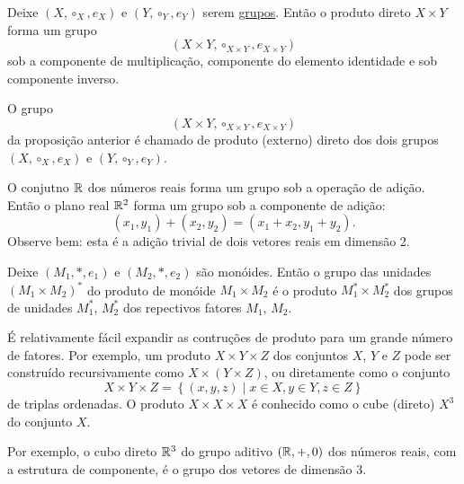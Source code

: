 \begin{stat}
  Deixe $(X, \circ_{X}, e_{X})$ e $(Y, \circ_{Y}, e_{Y})$ serem \underline{grupos}. Então o produto direto $X\times Y$ forma um grupo
  $$(X\times Y, \circ_{X\times Y}, e_{X\times Y})$$ sob a componente de multiplicação, componente do elemento identidade e sob componente inverso.
\end{stat}

\begin{definition}
  O grupo $$(X\times Y, \circ_{X\times Y}, e_{X\times Y})$$ da proposição anterior é chamado de produto (externo) direto dos dois grupos $(X, \circ_{X}, e_{X})$ e $(Y, \circ_{Y}, e_{Y})$.
\end{definition}

\begin{exmp}
  O conjutno $\mathbb{R}$ dos números reais forma um grupo sob a operação de adição. Então o plano real $\mathbb{R}^{2}$ forma um grupo sob a componente de adição:
  $$(x_{1},y_{1}) + (x_{2},y_{2}) = (x_{1}+x_{2}, y_{1}+y_{2}).$$
  Observe bem: esta é a adição trivial de dois vetores reais em dimensão 2.
\end{exmp}

\begin{theorem}
  Deixe $(M_{1},*,e_{1})$ e $(M_{2},*,e_{2})$ são monóides. Então o grupo das unidades $(M_{1} \times M_{2})^{*}$ do produto de monóide $M_{1} \times M_{2}$ é o produto $M_{1}^* \times M_{2}^*$ dos grupos de unidades $M_{1}^*$, $M_{2}^*$ dos repectivos fatores $M_{1}$, $M_{2}$.
\end{theorem}

É relativamente fácil expandir as contruções de produto para um grande número de fatores. Por exemplo, um produto $X\times Y\times Z$ dos conjuntos $X$, $Y$ e $Z$ pode ser construído recursivamente como $X \times \left(Y\times Z\right)$, ou diretamente como o conjunto
$$ X\times Y \times Z = \left\{(x,y,z) \mid x \in X, y\in Y, z\in Z\right\}$$
de triplas ordenadas. O produto $X\times X \times X$ é conhecido como o cube (direto) $X^{3}$ do conjunto $X$.

Por exemplo, o cubo direto $\mathbb{R}^{3}$ do grupo aditivo $(\mathbb{R}, +, 0)$ dos números reais, com a estrutura de componente, é o grupo dos vetores de dimensão $3$.

